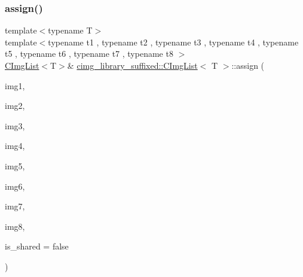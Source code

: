 \mbox{\label{structcimg__library__suffixed_1_1CImgList_aa45ecbaeb291ea1da01065d5b6c94b90}} 
\subsubsection{\texorpdfstring{assign()}{assign()}\hspace{0.1cm}{\footnotesize\ttfamily [15/18]}}
{\footnotesize\ttfamily template$<$typename T$>$ \\
template$<$typename t1 , typename t2 , typename t3 , typename t4 , typename t5 , typename t6 , typename t7 , typename t8 $>$ \\
\hyperlink{structcimg__library__suffixed_1_1CImgList}{C\+Img\+List}$<$T$>$\& \hyperlink{structcimg__library__suffixed_1_1CImgList}{cimg\+\_\+library\+\_\+suffixed\+::\+C\+Img\+List}$<$ T $>$\+::assign (\begin{DoxyParamCaption}\item[{const \hyperlink{structcimg__library__suffixed_1_1CImg}{C\+Img}$<$ t1 $>$ \&}]{img1,  }\item[{const \hyperlink{structcimg__library__suffixed_1_1CImg}{C\+Img}$<$ t2 $>$ \&}]{img2,  }\item[{const \hyperlink{structcimg__library__suffixed_1_1CImg}{C\+Img}$<$ t3 $>$ \&}]{img3,  }\item[{const \hyperlink{structcimg__library__suffixed_1_1CImg}{C\+Img}$<$ t4 $>$ \&}]{img4,  }\item[{const \hyperlink{structcimg__library__suffixed_1_1CImg}{C\+Img}$<$ t5 $>$ \&}]{img5,  }\item[{const \hyperlink{structcimg__library__suffixed_1_1CImg}{C\+Img}$<$ t6 $>$ \&}]{img6,  }\item[{const \hyperlink{structcimg__library__suffixed_1_1CImg}{C\+Img}$<$ t7 $>$ \&}]{img7,  }\item[{const \hyperlink{structcimg__library__suffixed_1_1CImg}{C\+Img}$<$ t8 $>$ \&}]{img8,  }\item[{const bool}]{is\+\_\+shared = {\ttfamily false} }\end{DoxyParamCaption})\hspace{0.3cm}{\ttfamily [inline]}}




